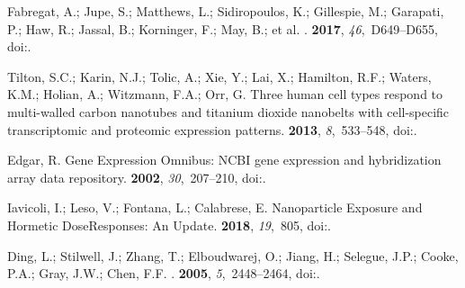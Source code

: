 \documentclass[ijms,article,accept,moreauthors,pdftex]{Definitions/mdpi}
\begin{document}
\begin{thebibliography}{999}
Fabregat, A.; Jupe, S.; Matthews, L.; Sidiropoulos, K.; Gillespie, M.;
  Garapati, P.; Haw, R.; Jassal, B.; Korninger, F.; May, B.; et al.
.
 {\bf 2017}, {\em 46},~D649--D655,
\newblock
  doi:{\href{https://doi.org/10.1093/nar/gkx1132}{}}.

Tilton, S.C.; Karin, N.J.; Tolic, A.; Xie, Y.; Lai, X.; Hamilton, R.F.; Waters,
  K.M.; Holian, A.; Witzmann, F.A.; Orr, G.
\newblock Three human cell types respond to multi-walled carbon nanotubes and
  titanium dioxide nanobelts with cell-specific transcriptomic and proteomic
  expression patterns.
 {\bf 2013}, {\em 8},~533--548,
\newblock
  doi:{\href{https://doi.org/10.3109/17435390.2013.803624}{}}.

Edgar, R.
\newblock Gene Expression Omnibus: {NCBI} gene expression and hybridization
  array data repository.
 {\bf 2002}, {\em 30},~207--210,
\newblock
  doi:{\href{https://doi.org/10.1093/nar/30.1.207}{}}.

Iavicoli, I.; Leso, V.; Fontana, L.; Calabrese, E.
\newblock Nanoparticle Exposure and Hormetic Dose{\textendash}Responses: An
  Update.
 {\bf 2018}, {\em
  19},~805,
\newblock
  doi:{\href{https://doi.org/10.3390/ijms19030805}{}}.

Ding, L.; Stilwell, J.; Zhang, T.; Elboudwarej, O.; Jiang, H.; Selegue, J.P.;
  Cooke, P.A.; Gray, J.W.; Chen, F.F.
.
 {\bf 2005}, {\em 5},~2448--2464,
\newblock
  doi:{\href{https://doi.org/10.1021/nl051748o}{}}.


\end{thebibliography}
\end{document}
